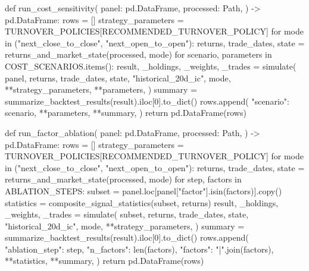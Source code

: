 \documentclass[UTF8,a4paper,fontset=fandol]{ctexart}
\begin{document}
\begin{ProjectCode}
def run_cost_sensitivity(
    panel: pd.DataFrame,
    processed: Path,
) -> pd.DataFrame:
    rows = []
    strategy_parameters = TURNOVER_POLICIES[RECOMMENDED_TURNOVER_POLICY]
    for mode in ("next_close_to_close", "next_open_to_open"):
        returns, trade_dates, state = returns_and_market_state(processed, mode)
        for scenario, parameters in COST_SCENARIOS.items():
            result, _holdings, _weights, _trades = simulate(
                panel,
                returns,
                trade_dates,
                state,
                "historical_20d_ic",
                mode,
                **strategy_parameters,
                **parameters,
            )
            summary = summarize_backtest_results(result).iloc[0].to_dict()
            rows.append({
                "scenario": scenario,
                **parameters,
                **summary,
            })
    return pd.DataFrame(rows)


def run_factor_ablation(
    panel: pd.DataFrame,
    processed: Path,
) -> pd.DataFrame:
    rows = []
    strategy_parameters = TURNOVER_POLICIES[RECOMMENDED_TURNOVER_POLICY]
    for mode in ("next_close_to_close", "next_open_to_open"):
        returns, trade_dates, state = returns_and_market_state(processed, mode)
        for step, factors in ABLATION_STEPS:
            subset = panel.loc[panel["factor"].isin(factors)].copy()
            statistics = composite_signal_statistics(subset, returns)
            result, _holdings, _weights, _trades = simulate(
                subset,
                returns,
                trade_dates,
                state,
                "historical_20d_ic",
                mode,
                **strategy_parameters,
            )
            summary = summarize_backtest_results(result).iloc[0].to_dict()
            rows.append({
                "ablation_step": step,
                "n_factors": len(factors),
                "factors": "|".join(factors),
                **statistics,
                **summary,
            })
    return pd.DataFrame(rows)



\end{ProjectCode}
\end{document}
